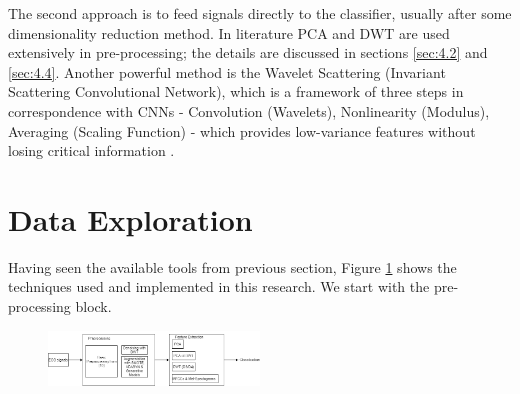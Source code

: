 \documentclass[a4paper,10pt,twocolumn]{article}
\begin{document}
The second approach is to feed signals directly to the classifier, usually after some dimensionality reduction method. In literature PCA and DWT \cite{elhaj2016arrhythmia,emanet2009ecg,catalani2013arrhythmia} are used extensively in pre-processing; the details are discussed in sections \ref{sec:4.2} and \ref{sec:4.4}. Another powerful method is the Wavelet Scattering (Invariant Scattering Convolutional Network), which is a framework of three steps in correspondence with CNNs - Convolution (Wavelets), Nonlinearity (Modulus), Averaging (Scaling Function)
- which provides low-variance features without losing critical information \cite{anden2014deep}.

\section{Data Exploration}
\label{sec:data_exploration}
Having seen the available tools from previous section, Figure \ref{fig:implemented} shows the techniques used and implemented in this research. We start with the pre-processing block.

\begin{figure}[h]
    \centering
    \includegraphics[width=0.5\textwidth]{images/implemented.png}
      \label{fig:implemented}
\end{figure}
\end{document}
